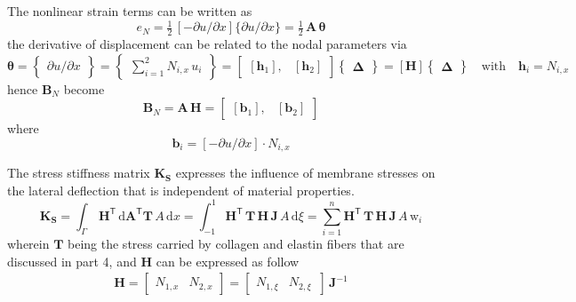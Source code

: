 The nonlinear strain terms can be written as 
\begin{equation}
e_ N =  \tfrac{1}{2} \,
 [-\partial u / \partial x ]
\{\partial u / \partial x\}
= \tfrac{1}{2} \, \mathbf{A} \, \boldsymbol{\theta}
\end{equation}
the derivative of displacement can be related to the nodal parameters via
\begin{equation}
\boldsymbol{\theta} =  \begin{Bmatrix}
\partial u / \partial x
\end{Bmatrix}
= \begin{Bmatrix}
\sum\nolimits_{i=1}^2 N_{i,x} \, u_i
\end{Bmatrix} 
= \begin{bmatrix}
[\mathbf{h}_1], & [\mathbf{h}_2]
\end{bmatrix}  \begin{Bmatrix} \boldsymbol{\Delta} \end{Bmatrix}  
= [\mathbf{H}] \begin{Bmatrix} \boldsymbol{\Delta} \end{Bmatrix} \quad \text{with} \quad \mathbf{h}_i = N_{i,x}  
\end{equation}
hence $\mathbf{B}_N$ become
\begin{equation}
\mathbf{B}_N = \mathbf{A} \, \mathbf{H}  =  \begin{bmatrix}
[\mathbf{b}_1], & [\mathbf{b}_2] 
\end{bmatrix} 
\end{equation}
where
\begin{equation}
\mathbf{b}_i  =   
 [-\partial u / \partial x] \cdot
N_{i,x} 
\end{equation}

The stress stiffness matrix $\mathbf{K}_\mathbf{S}$ expresses the influence of membrane stresses on the lateral deflection that is independent of material properties.
\begin{equation}
\mathbf{K}_\mathbf{S} = \int_{\Gamma} \, \mathbf{H}^{\mathsf{T}} \, \mathrm{d} \mathbf{A}^{\mathsf{T}} \mathbf{T} \, A \, \mathrm{d} x 
= \int_{-1}^{1} \mathbf{H}^{\mathsf{T}} \,  \mathbf{T} \, \mathbf{H} \, \mathbf{J}  \, A \,  \mathrm{d} \xi
 = \sum_{i=1}^{n}  \mathbf{H}^{\mathsf{T}} \, \mathbf{T} \, \mathbf{H}  \, \mathbf{J} \, A \, \mathrm{w}_i
\end{equation}
wherein $\mathbf{T}$ being the stress carried by collagen and elastin fibers that are discussed in part 4, and $\mathbf{H}$ can be expressed as follow
\begin{equation}
\begin{aligned}
\mathbf{H} = \begin{bmatrix}
 N_{1,x} &  N_{2,x}
\end{bmatrix} = \begin{bmatrix}
 N_{1,\xi} & N_{2,\xi} \, 
\end{bmatrix} \, \mathbf{J}^{-1}
\end{aligned}
\end{equation}

